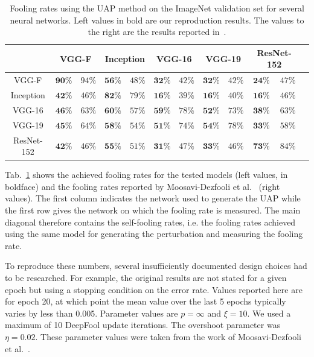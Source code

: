 \documentclass[runningheads]{llncs}
\begin{document}
\bgroup

\setlength\tabcolsep{0.2cm}
\begin{table}[htbp]
\centering
\caption{Fooling rates using the UAP method on the ImageNet validation set for several neural networks. Left values in bold are our reproduction results. The values to the right are the results reported in~\cite{moosavidezfooli_universal_2017}.}
\begin{tabular}{|c|c|c|c|c|c|c|c|c|c|c|c|}
\hline

			& \multicolumn{2}{|c|}{VGG-F}			&	\multicolumn{2}{|c|}{Inception}		&	\multicolumn{2}{|c|}{VGG-16}			&	\multicolumn{2}{|c|}{VGG-19}			&	\multicolumn{2}{|c|}{ResNet-152}	\\ \hline
VGG-F		& $\mathbf{90\%} $&$ 94\%$	&	$\mathbf{56\%} $&$ 48\%$	&	$\mathbf{32\%} $&$ 42\%$	&	$\mathbf{32\%} $&$ 42\%$	& 	$\mathbf{24\%} $&$ 47\%$		\\
Inception	& $\mathbf{42\%} $&$ 46\%$	&	$\mathbf{82\%} $&$ 79\%$	&	$\mathbf{16\%} $&$ 39\%$	&	$\mathbf{16\%} $&$ 40\%$	& 	$\mathbf{16\%} $&$ 46\%$	\\
VGG-16		& $\mathbf{46\%} $&$ 63\%$	&	$\mathbf{60\%} $&$ 57\%$	&	$\mathbf{59\%} $&$ 78\%$	&	$\mathbf{52\%} $&$ 73\%$	& 	$\mathbf{38\%} $&$ 63\%$	\\
VGG-19		& $\mathbf{45\%} $&$ 64\%$	&	$\mathbf{58\%} $&$ 54\%$	&	$\mathbf{51\%} $&$ 74\%$	&	$\mathbf{54\%} $&$ 78\%$	& 	$\mathbf{33\%} $&$ 58\%$	\\
ResNet-152	& $\mathbf{42\%} $&$ 46\%$	&	$\mathbf{55\%} $&$ 51\%$	&	$\mathbf{31\%} $&$ 47\%$	&	$\mathbf{33\%} $&$ 46\%$	& 	$\mathbf{73\%} $&$ 84\%$	\\
\hline 
\end{tabular}
\label{tbl_stoerraten_reprod_kreuz_linf}
\end{table}
\egroup

Tab.~\ref{tbl_stoerraten_reprod_kreuz_linf} shows the achieved fooling rates for the tested models (left values, in boldface) and the fooling rates reported by Moosavi-Dezfooli et al.~\cite{moosavidezfooli_universal_2017} (right values). The first column indicates the network used to generate the UAP while the first row gives the network on which the fooling rate is measured. The main diagonal therefore contains the self-fooling rates, i.e. the fooling rates achieved using the same model for generating the perturbation and measuring the fooling rate. 

To reproduce these numbers, several insufficiently documented design choices had to be researched. For example, the original results are not stated for a given epoch but using a stopping condition on the error rate. Values reported here are for epoch 20, at which point the mean value over the last 5 epochs typically varies by less than 0.005. Parameter values are \(p=\infty\) and \(\xi=10\). We used a maximum of 10 DeepFool update iterations. The overshoot parameter was \(\eta=0.02\). These parameter values were taken from the work of Moosavi-Dezfooli et al.~\cite{moosavidezfooli_universal_2017,moosavi-dezfooli_deepfool_2016}. 
\end{document}
